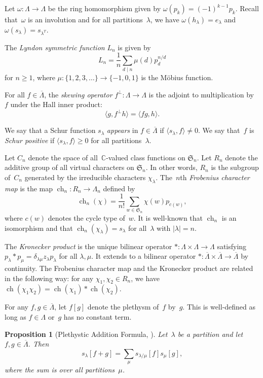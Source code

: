 \documentclass[11pt]{article}
\newtheorem{prop}[theo]{Proposition}
\theoremstyle{definition}
\numberwithin{equation}{section}
\newcommand{\K}{\mathbb{C}}
\newcommand{\Sym}{\mathfrak{S}}
\DeclareMathOperator{\ch}{ch}
\begin{document}
Let $\omega \colon \Lambda \to \Lambda$ be the ring homomorphism given by $\omega(p_k) = (-1)^{k-1} p_k$. Recall that~$\omega$ is an involution and for all partitions~$\lambda$, we have $\omega(h_\lambda) = e_\lambda$ and $\omega(s_\lambda) = s_{\lambda^T}$.

The \emph{Lyndon symmetric function} $L_n$ is given by \[L_n = \frac{1}{n} \sum_{d \mid n} \mu(d) p_d^{n/d}\] for $n \geq 1$, where $\mu \colon \{1, 2, 3, \ldots\} \to \{-1, 0, 1\}$ is the M\"obius function.

For all $f \in \overline{\Lambda}$, the \emph{skewing operator} $f^\perp \colon \Lambda \to \Lambda$ is the adjoint to multiplication by~$f$ under the Hall inner product: \[\langle g, f^\perp h \rangle = \langle fg, h \rangle.\]

We say that a Schur function $s_\lambda$ \emph{appears} in $f \in \overline{\Lambda}$ if $\langle s_\lambda, f \rangle \neq 0$. We say that~$f$ is \emph{Schur positive} if $\langle s_\lambda, f \rangle \geq 0$ for all partitions~$\lambda$.

Let $C_n$ denote the space of all~$\K$-valued class functions on $\Sym_n$. Let $R_n$ denote the additive group of all virtual characters on $\Sym_n$. In other words, $R_n$ is the subgroup of~$C_n$ generated by the irreducible characters $\chi_\lambda$. The~$n$th \emph{Frobenius character map} is the map $\ch_n \colon R_n \to \Lambda_n$ defined by \[\ch_n(\chi) = \frac{1}{n!}\sum_{w \in \Sym_n} \chi(w) p_{c(w)},\] where $c(w)$ denotes the cycle type of~$w$. It is well-known that $\ch_n$ is an isomorphism and that $\ch_n(\chi_\lambda) = s_\lambda$ for all~$\lambda$ with $|\lambda| = n$.

The \emph{Kronecker product} is the unique bilinear operator $\ast \colon \Lambda \times \Lambda \to \Lambda$ satisfying $p_\lambda \ast p_\mu = \delta_{\lambda \mu} z_\lambda p_\lambda$ for all $\lambda, \mu$. It extends to a bilinear operator $\ast \colon \overline{\Lambda} \times \overline{\Lambda} \to \overline{\Lambda}$ by continuity. The Frobenius character map and the Kronecker product are related in the following way: for any $\chi_1, \chi_2 \in R_n$, we have $\ch(\chi_1 \chi_2) = \ch(\chi_1) \ast \ch(\chi_2)$.

For any $f, g \in \overline{\Lambda}$, let $f[g]$ denote the plethysm of~$f$ by~$g$. This is well-defined as long as $f \in \Lambda$ or~$g$ has no constant term.

\begin{prop}[{Plethystic Addition Formula, \cite[Section~3.2]{MR2765321}}]\label{proposition:plethysticaddition}
    Let~$\lambda$ be a partition and let $f, g \in \overline{\Lambda}$. Then
    \[s_{\lambda}[f + g] = \sum_{\mu} s_{\lambda / \mu}[f] s_\mu[g],\] where the sum is over all partitions~$\mu$.
\end{prop}
\end{document}
